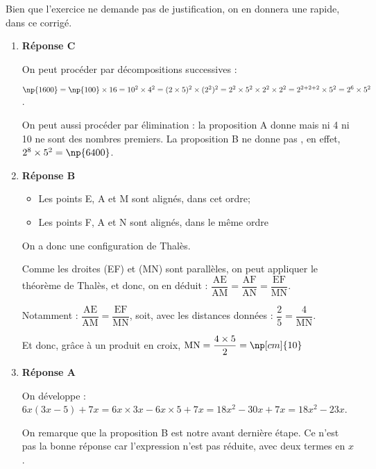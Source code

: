 
\medskip

Bien que l'exercice ne demande pas de justification, on en donnera une rapide, dans ce corrigé.

\begin{enumerate}
	\item \textbf{Réponse C}
	
	On peut procéder par décompositions successives : 
	
$\np{1600} = \np{100}\times 16 = 10^2\times 4^2 = (2\times 5)^2 \times (2^2)^2= 2^2\times 5^2\times 2^2\times 2^2 = 2^{2 + 2 + 2}\times 5^2 = 2^6 \times 5^2$.
	
On peut aussi procéder par élimination :  la proposition A donne  mais ni 4 ni 10 ne sont des nombres premiers. La proposition B ne donne pas , en effet, $2^8\times 5^2 = \np{6400}$.
	
	\item  \textbf{Réponse B}
	\begin{itemize}
		\item Les points E, A et M sont alignés, dans cet ordre;
		\item Les points F, A et N sont alignés, dans le même ordre
	\end{itemize}
On a donc une configuration de Thalès.
	
Comme les droites (EF) et (MN) sont parallèles, on peut appliquer le théorème de Thalès, et donc, on en déduit :
	\quad
	$\dfrac{\text{AE}}{\text{AM}} = \dfrac{\text{AF}}{\text{AN}} = \dfrac{\text{EF}}{\text{MN}}$.
	
Notamment : $\dfrac{\text{AE}}{\text{AM}} = \dfrac{\text{EF}}{\text{MN}}$, soit, avec les distances données : $\dfrac{\text{2}}{\text{5}} = \dfrac{\text{4}}{\text{MN}}$.
	
Et donc, grâce à un produit en croix, $\text{MN} = \dfrac{4\times 5}{2} =\np[cm]{10}$ 
	
	\item \textbf{Réponse A}
	
On développe : $6x(3x-5) + 7x = 6x\times 3x - 6x\times 5 + 7x = 18x^2 - 30x + 7x = 18x^2 - 23x$.
	
On remarque que la proposition B est notre avant dernière étape. Ce n'est pas la bonne réponse car l'expression n'est pas réduite, avec deux termes en $x$.
	
\end{enumerate}

\vspace{0,5cm}

